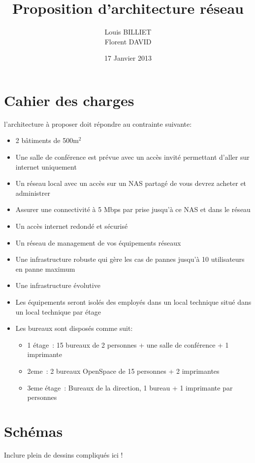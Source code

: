 \documentclass[oneside,10pt]{article}
\begin{document}
\title{Proposition d'architecture r\'eseau}
\author{Louis BILLIET \\ Florent DAVID}
\date{17 Janvier 2013}
\maketitle

\section{Cahier des charges}
l'architecture à proposer doit r\'epondre au contrainte suivante:
\begin{itemize}
  \item 2 b\^atiments de 500m$^{2}$
  \item Une salle de conf\'erence est pr\'evue avec un acc\`es invit\'e permettant d'aller sur internet uniquement
  \item Un r\'eseau local avec un acc\`es sur un NAS partag\'e de vous devrez acheter et administrer
  \item Assurer une connectivit\'e \`a 5 Mbps par prise jusqu'\`a ce NAS et dans le r\'eseau
  \item Un acc\`es internet redond\'e et s\'ecuris\'e
  \item Un r\'eseau de management de vos \'equipements r\'eseaux
  \item Une infrastructure robuste qui g\`ere les cas de pannes jusqu'\`a 10 utilisateurs en panne maximum
  \item Une infrastructure \'evolutive
  \item Les \'equipements seront isol\'es des employ\'es dans un local technique situ\'e dans un local technique par \'etage
  \item Les bureaux sont dispos\'es comme suit:
  \begin{itemize}
    \item 1 \'etage : 15 bureaux de 2 personnes + une salle de conf\'erence + 1 imprimante
    \item 2eme : 2 bureaux OpenSpace de 15 personnes + 2 imprimantes
    \item 3eme \'etage : Bureaux de la direction, 1 bureau + 1 imprimante par personnes 
  \end{itemize}
\end{itemize}

\section{Sch\'emas}
Inclure plein de dessins compliqu\'es ici !
\end{document}

